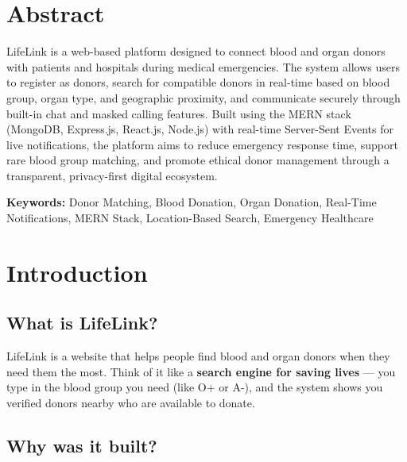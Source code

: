 \documentclass[12pt,a4paper]{article}
\begin{document}
\newpage
\tableofcontents
\newpage

\section{Abstract}

LifeLink is a web-based platform designed to connect blood and organ donors with patients and hospitals during medical emergencies. The system allows users to register as donors, search for compatible donors in real-time based on blood group, organ type, and geographic proximity, and communicate securely through built-in chat and masked calling features. Built using the MERN stack (MongoDB, Express.js, React.js, Node.js) with real-time Server-Sent Events for live notifications, the platform aims to reduce emergency response time, support rare blood group matching, and promote ethical donor management through a transparent, privacy-first digital ecosystem.

\textbf{Keywords:} Donor Matching, Blood Donation, Organ Donation, Real-Time Notifications, MERN Stack, Location-Based Search, Emergency Healthcare

\section{Introduction}

\subsection{What is LifeLink?}

LifeLink is a website that helps people find blood and organ donors when they need them the most. Think of it like a \textbf{search engine for saving lives} --- you type in the blood group you need (like O+ or A-), and the system shows you verified donors nearby who are available to donate.

\subsection{Why was it built?}
\end{document}
